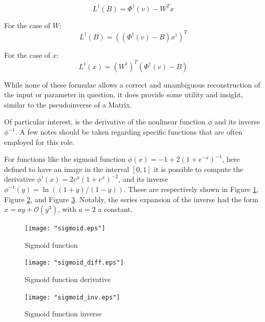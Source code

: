 \documentclass[10pt,journal,compsoc]{IEEEtran}
\newcommand{\cf}[1]{Figure \ref{#1}}
\newcommand{\zero}{\mathcal{O}}
\begin{document}
\begin{equation}
	L^\dagger(B) = \Phi^\dagger(v) - W^Tx
\end{equation}

For the case of $W$:
\begin{equation}
	L^\dagger(B) = \left(\left(\Phi^\dagger(v) - B\right) x^\dagger\right)^T
\end{equation}

For the case of $x$:
\begin{equation}\label{eq:layer_pseudo_inverse}
	L^\dagger(x) = \left(W^\dagger\right)^T\left(\Phi^\dagger(v) - B\right) 
\end{equation}

While none of these formulae allows a correct and unambiguous reconstruction of the input or parameter in question, it does provide some utility and insight, similar to the pseudoinverse of a Matrix.

Of particular interest, is the derivative of the nonlinear function $\phi$ and its inverse $\phi^{-1}$. A few notes should be taken regarding specific functions that are often employed for this role.

For functions like the sigmoid function $\phi(x) = -1+2 \left( 1+e^{-x} \right) ^{-1}$, here defined to have an image in the interval  $[0,1]$ it is possible to compute the derivative  $\phi'(x) = 2e^{x}(1+e^{x})^{-2}$, and its inverse $\phi^{-1}(y) = \ln \left( (1+y)/(1-y) \right)$. These are respectively shown in \cf{fig:sigmoid}, \cf{fig:sigmoid_derivative}, and \cf{fig:sigmoid_inverse}. Notably, the series expansion of the inverse had the form $x = ay+\zero{(y^3)}$, with $a=2$ a constant.

\begin{figure}[h!]
	\centering
	\texttt{[image: "sigmoid.eps"]}
	\caption{Sigmoid function}
	\label{fig:sigmoid}
\end{figure}

\begin{figure}[h!]
	\centering
	\texttt{[image: "sigmoid\_diff.eps"]}
	\caption{Sigmoid function derivative}
	\label{fig:sigmoid_derivative}
\end{figure}

\begin{figure}[h!]
	\centering
	\texttt{[image: "sigmoid\_inv.eps"]}
	\caption{Sigmoid function inverse}
	\label{fig:sigmoid_inverse}
\end{figure}
\end{document}
